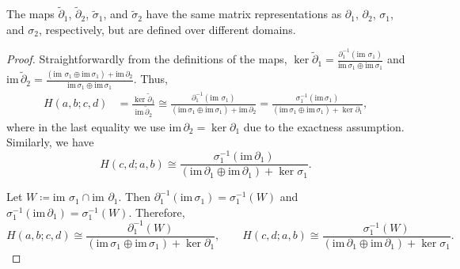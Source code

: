 \documentclass[10pt,a4paper]{amsart}
\begin{document}
\begin{rem}
	The maps $\tilde{\partial}_{1}$, $\tilde{\partial}_{2}$, $\tilde{\sigma}_{1}$,
	and $\tilde{\sigma}_{2}$ have the same matrix representations as
	$\partial_{1}$, $\partial_{2}$, $\sigma_{1}$, and $\sigma_{2}$,
	respectively, but are defined over different domains.
\end{rem}

\begin{proof}
	Straightforwardly from the definitions of the maps, $\ker\tilde{\partial}_{1}=\frac{\partial_{1}^{-1}\left(\text{im }\sigma_{1}\right)}{\text{im}\,\sigma_{1}\oplus\text{im}\,\sigma_{1}}$
	and $\text{im}\,\tilde{\partial}_{2}=\frac{\left(\text{im }\sigma_{1}\oplus\text{im}\,\sigma_{1}\right)+\text{im}\,\partial_{2}}{\text{im}\,\sigma_{1}\oplus\text{im}\,\sigma_{1}}$.
	Thus, 
	\begin{align}
		H\left(a,b;c,d\right) & =\frac{\ker\tilde{\partial}_{1}}{\text{im}\,\tilde{\partial}_{2}}\cong\frac{\partial_{1}^{-1}\left(\text{im }\sigma_{1}\right)}{\left(\text{im}\,\sigma_{1}\oplus\text{im}\,\sigma_{1}\right)+\text{im}\,\partial_{2}}=\frac{\sigma_{1}^{-1}\left(\text{im}\,\sigma_{1}\right)}{\left(\text{im}\,\sigma_{1}\oplus\text{im}\,\sigma_{1}\right)+\ker\partial_{1}},\label{eq:K1-1}
	\end{align}
	where in the last equality we use $\text{im}\,\partial_{2}=\ker\partial_{1}$
	due to the exactness assumption. Similarly, we have 
	\begin{equation}
		H\left(c,d;a,b\right)\cong\frac{\sigma_{1}^{-1}\left(\text{im}\,\partial_{1}\right)}{\left(\text{im}\,\partial_{1}\oplus\text{im}\,\partial_{1}\right)+\ker\sigma_{1}}.
	\end{equation}
	
	Let $W\coloneqq\text{im }\sigma_{1}\cap\text{im }\partial_{1}$. Then
	$\partial_{1}^{-1}\left(\text{im}\,\sigma_{1}\right)=\sigma_{1}^{-1}\left(W\right)$
	and $\sigma_{1}^{-1}\left(\text{im}\,\partial_{1}\right)=\sigma_{1}^{-1}\left(W\right)$.
	Therefore,
	\begin{equation}
		H\left(a,b;c,d\right)\cong\frac{\partial_{1}^{-1}\left(W\right)}{\left(\text{im}\,\sigma_{1}\oplus\text{im}\,\sigma_{1}\right)+\ker\partial_{1}},\qquad H\left(c,d;a,b\right)\cong\frac{\sigma_{1}^{-1}\left(W\right)}{\left(\text{im}\,\partial_{1}\oplus\text{im}\,\partial_{1}\right)+\ker\sigma_{1}}.
	\end{equation}
	

\end{proof}
\end{document}
